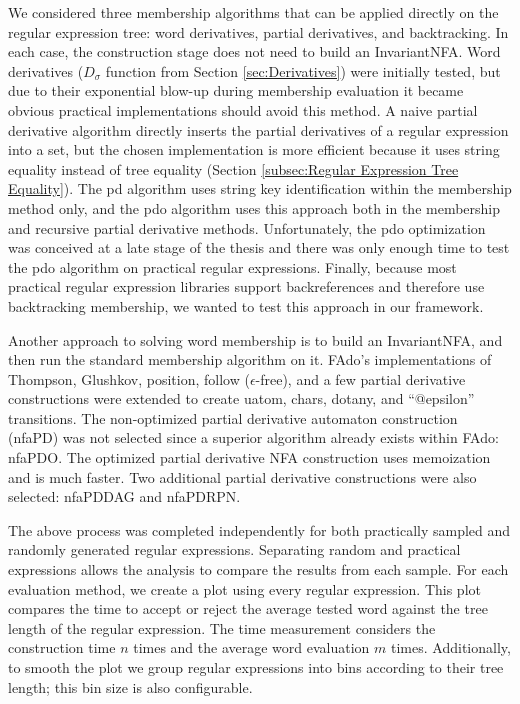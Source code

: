 We considered three membership algorithms that can be applied directly on the regular expression tree: word derivatives, partial derivatives, and backtracking. In each case, the construction stage does not need to build an InvariantNFA. Word derivatives ($D_\sigma$ function from Section \ref{sec:Derivatives}) were initially tested, but due to their exponential blow-up during membership evaluation it became obvious practical implementations should avoid this method. A naive partial derivative algorithm directly inserts the partial derivatives of a regular expression into a set, but the chosen implementation is more efficient because it uses string equality instead of tree equality (Section \ref{subsec:Regular Expression Tree Equality}). The pd algorithm uses string key identification within the membership method only, and the pdo algorithm uses this approach both in the membership and recursive partial derivative methods. Unfortunately, the pdo optimization was conceived at a late stage of the thesis and there was only enough time to test the pdo algorithm on practical regular expressions. Finally, because most practical regular expression libraries support backreferences and therefore use backtracking membership, we wanted to test this approach in our framework.

Another approach to solving word membership is to build an InvariantNFA, and then run the standard membership algorithm on it. FAdo's implementations of Thompson, Glushkov, position, follow ($\epsilon$-free), and a few partial derivative constructions were extended to create uatom, chars, dotany, and ``@epsilon'' transitions. The non-optimized partial derivative automaton construction (nfaPD) was not selected since a superior algorithm already exists within FAdo: nfaPDO. The optimized partial derivative NFA construction uses memoization and is much faster. Two additional partial derivative constructions were also selected: nfaPDDAG and nfaPDRPN.

The above process was completed independently for both practically sampled and randomly generated regular expressions. Separating random and practical expressions allows the analysis to compare the results from each sample. For each evaluation method, we create a plot using every regular expression. This plot compares the time to accept or reject the average tested word against the tree length of the regular expression. The time measurement considers the construction time $n$ times and the average word evaluation $m$ times. Additionally, to smooth the plot we group regular expressions into bins according to their tree length; this bin size is also configurable.

